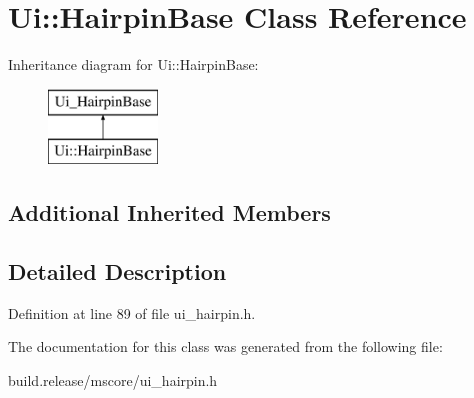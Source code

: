 \hypertarget{class_ui_1_1_hairpin_base}{}\section{Ui\+:\+:Hairpin\+Base Class Reference}
\label{class_ui_1_1_hairpin_base}
Inheritance diagram for Ui\+:\+:Hairpin\+Base\+:\begin{figure}[H]
\begin{center}
\leavevmode
\includegraphics[height=2.000000cm]{class_ui_1_1_hairpin_base}
\end{center}
\end{figure}
\subsection*{Additional Inherited Members}


\subsection{Detailed Description}


Definition at line 89 of file ui\+\_\+hairpin.\+h.



The documentation for this class was generated from the following file\+:\begin{DoxyCompactItemize}
\item 
build.\+release/mscore/ui\+\_\+hairpin.\+h\end{DoxyCompactItemize}
